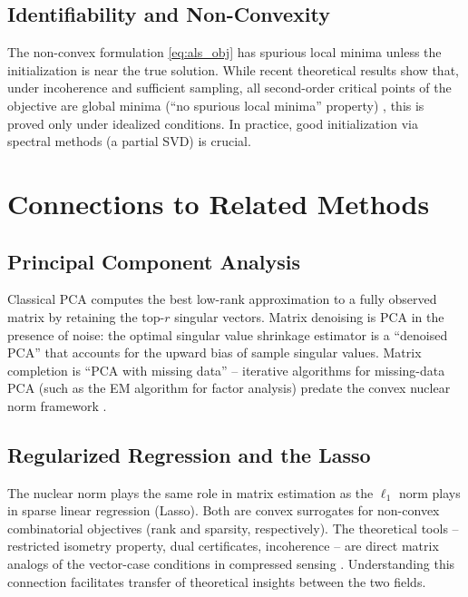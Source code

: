 \documentclass[conference]{IEEEtran}
\begin{document}
\subsection{Identifiability and Non-Convexity}

The non-convex formulation \eqref{eq:als_obj} has spurious local minima unless the initialization is near the true solution. While recent theoretical results show that, under incoherence and sufficient sampling, all second-order critical points of the objective are global minima (``no spurious local minima'' property) \cite{ge2016matrix}, this is proved only under idealized conditions. In practice, good initialization via spectral methods (a partial SVD) is crucial.

\section{Connections to Related Methods}
\label{sec:connections}

\subsection{Principal Component Analysis}

Classical PCA computes the best low-rank approximation to a fully observed matrix by retaining the top-$r$ singular vectors. Matrix denoising is PCA in the presence of noise: the optimal singular value shrinkage estimator is a ``denoised PCA'' that accounts for the upward bias of sample singular values. Matrix completion is ``PCA with missing data'' -- iterative algorithms for missing-data PCA (such as the EM algorithm for factor analysis) predate the convex nuclear norm framework \cite{tipping1999probabilistic}.

\subsection{Regularized Regression and the Lasso}

The nuclear norm plays the same role in matrix estimation as the $\ell_1$ norm plays in sparse linear regression (Lasso). Both are convex surrogates for non-convex combinatorial objectives (rank and sparsity, respectively). The theoretical tools -- restricted isometry property, dual certificates, incoherence -- are direct matrix analogs of the vector-case conditions in compressed sensing \cite{donoho2006compressed}. Understanding this connection facilitates transfer of theoretical insights between the two fields.
\end{document}
